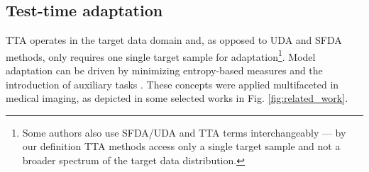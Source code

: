     \subsection{Test-time adaptation} %

    TTA operates in the target data domain and, as opposed to UDA and SFDA methods, only requires one single target sample for adaptation\footnote{Some authors also use SFDA/UDA and TTA terms interchangeably --- by our definition TTA methods access only a single target sample and not a broader spectrum of the target data distribution.}.
    Model adaptation can be driven by minimizing entropy-based measures \cite{wang2020tent,bateson2020source}
    and the introduction of auxiliary tasks \cite{sun2020test,karani2021test,lyu2022learning}.
    These concepts were applied multifaceted in medical imaging, as depicted in some selected works in Fig. \ref{fig:related_work}.

